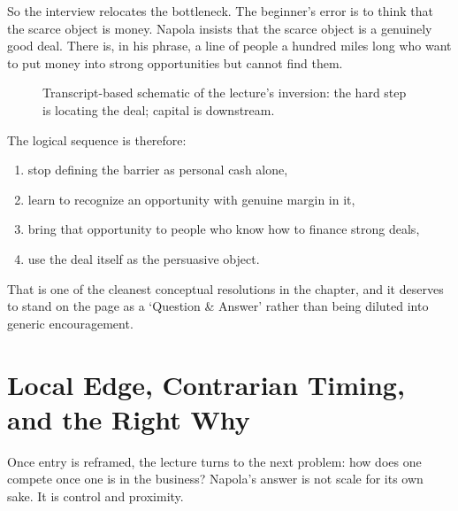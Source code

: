 So the interview relocates the bottleneck. The beginner's error is to think that the scarce object is money. Napola insists that the scarce object is a genuinely good deal. There is, in his phrase, a line of people a hundred miles long who want to put money into strong opportunities but cannot find them.

\begin{figure}[h]
\centering
{}
\caption{Transcript-based schematic of the lecture's inversion: the hard step is locating the deal; capital is downstream.}
\end{figure}

The logical sequence is therefore:
\begin{enumerate}
\item stop defining the barrier as personal cash alone,
\item learn to recognize an opportunity with genuine margin in it,
\item bring that opportunity to people who know how to finance strong deals,
\item use the deal itself as the persuasive object.
\end{enumerate}

That is one of the cleanest conceptual resolutions in the chapter, and it deserves to stand on the page as a `Question \& Answer' rather than being diluted into generic encouragement.

\section{Local Edge, Contrarian Timing, and the Right Why}

Once entry is reframed, the lecture turns to the next problem: how does one compete once one is in the business? Napola's answer is not scale for its own sake. It is control and proximity.

